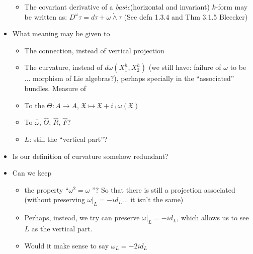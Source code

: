 \begin{itemize}
\begin{itemize}
        \item The covariant derivative of a \emph{basic}(horizontal and invariant) $k$-form may be written as: $D^\omega \tau = d\tau + \omega \dot{\wedge} \tau$ (See defn 1.3.4 and Thm 3.1.5 Bleecker) 
    \end{itemize}
    
    
    
    \item What meaning may be given to \label{whatMeaning}
    \begin{itemize}
        \item The connection, instead of vertical projection
        
        \item The curvature, instead of $d\omega(X_1^h, X_2^h)$ (we still have: failure of $\omega$ to be ... morphism of Lie algebras?), perhaps specially in the ``associated'' bundles. Measure of 
        
        \item To the $\Theta:A \to A$, $\mathfrak X \mapsto \mathfrak X + i \comp \omega(\mathfrak X)$ 
        
        \item To $\hat \omega$, $\hat \Theta$, $\hat R$, $\hat F$?
        
        \item $L$: still the ``vertical part''?
    \end{itemize}
    
    \item Is our definition of curvature somehow redundant? \label{curvatureRedundant}
    
    \item Can we keep \label{canKeep}
    \begin{itemize}
        \item the property ``$\omega^2 = \omega$ ''? So that there is still a projection associated (without preserving $\omega |_L = -id_L$... it isn't the same)
        
        \item Perhaps, instead, we try can preserve $\omega |_L = -id_L$, which allows us to see $L$ as the vertical part.
        
        \item Would it make sense to say $\omega_L = -2id_L$
    \end{itemize}
\end{itemize}

